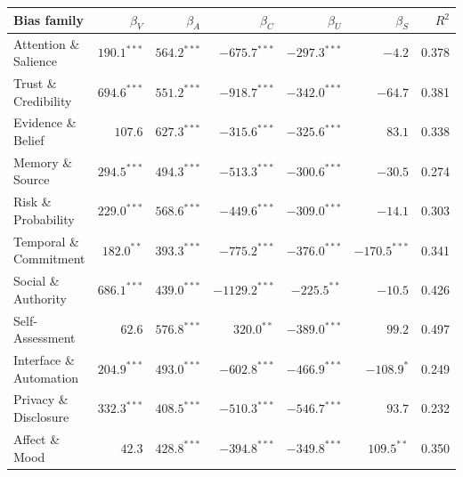 \begin{tabularx}{\linewidth}{Xrrrrrr}
\toprule
Bias family & $\beta_{V}$ & $\beta_{A}$ & $\beta_{C}$ & $\beta_{U}$ & $\beta_{S}$ & $R^2$ \\
\midrule
Attention \& Salience & $190.1^{***}$ & $564.2^{***}$ & $-675.7^{***}$ & $-297.3^{***}$ & $-4.2$ & 0.378 \\
Trust \& Credibility & $694.6^{***}$ & $551.2^{***}$ & $-918.7^{***}$ & $-342.0^{***}$ & $-64.7$ & 0.381 \\
Evidence \& Belief & $107.6$ & $627.3^{***}$ & $-315.6^{***}$ & $-325.6^{***}$ & $83.1$ & 0.338 \\
Memory \& Source & $294.5^{***}$ & $494.3^{***}$ & $-513.3^{***}$ & $-300.6^{***}$ & $-30.5$ & 0.274 \\
Risk \& Probability & $229.0^{***}$ & $568.6^{***}$ & $-449.6^{***}$ & $-309.0^{***}$ & $-14.1$ & 0.303 \\
Temporal \& Commitment & $182.0^{**}$ & $393.3^{***}$ & $-775.2^{***}$ & $-376.0^{***}$ & $-170.5^{***}$ & 0.341 \\
Social \& Authority & $686.1^{***}$ & $439.0^{***}$ & $-1129.2^{***}$ & $-225.5^{**}$ & $-10.5$ & 0.426 \\
Self-Assessment & $62.6$ & $576.8^{***}$ & $320.0^{**}$ & $-389.0^{***}$ & $99.2$ & 0.497 \\
Interface \& Automation & $204.9^{***}$ & $493.0^{***}$ & $-602.8^{***}$ & $-466.9^{***}$ & $-108.9^{*}$ & 0.249 \\
Privacy \& Disclosure & $332.3^{***}$ & $408.5^{***}$ & $-510.3^{***}$ & $-546.7^{***}$ & $93.7$ & 0.232 \\
Affect \& Mood & $42.3$ & $428.8^{***}$ & $-394.8^{***}$ & $-349.8^{***}$ & $109.5^{**}$ & 0.350 \\
\bottomrule
\end{tabularx}

